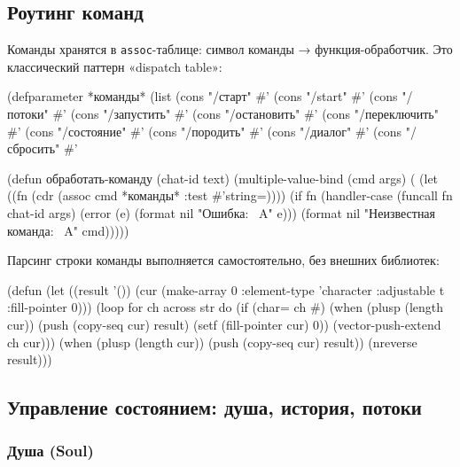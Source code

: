 \documentclass[11pt,a4paper]{article}
\begin{document}
\subsection{Роутинг команд}

Команды хранятся в \texttt{assoc}-таблице: символ команды → функция-обработчик. Это классический паттерн «dispatch table»:

\begin{lispcode}[caption={мастер/cl/команды.lisp — dispatch table}]
(defparameter *команды*
  (list (cons "/старт"       #'%
        (cons "/start"       #'%
        (cons "/потоки"      #'%
        (cons "/запустить"   #'%
        (cons "/остановить"  #'%
        (cons "/переключить" #'%
        (cons "/состояние"   #'%
        (cons "/породить"    #'%
        (cons "/диалог"      #'%
        (cons "/сбросить"    #'%

(defun обработать-команду (chat-id text)
  (multiple-value-bind (cmd args) (%
    (let ((fn (cdr (assoc cmd *команды* :test #'string=))))
      (if fn
          (handler-case (funcall fn chat-id args)
            (error (e) (format nil "Ошибка: ~A" e)))
          (format nil "Неизвестная команда: ~A" cmd)))))
\end{lispcode}

Парсинг строки команды выполняется самостоятельно, без внешних библиотек:

\begin{lispcode}[caption={мастер/cl/команды.lisp — разбор строки команды}]
(defun %
  (let ((result '())
        (cur (make-array 0 :element-type 'character
                           :adjustable t :fill-pointer 0)))
    (loop for ch across str do
      (if (char= ch #\Space)
          (when (plusp (length cur))
            (push (copy-seq cur) result)
            (setf (fill-pointer cur) 0))
          (vector-push-extend ch cur)))
    (when (plusp (length cur))
      (push (copy-seq cur) result))
    (nreverse result)))
\end{lispcode}

\subsection{Управление состоянием: душа, история, потоки}

\subsubsection{Душа (Soul)}
\end{document}
